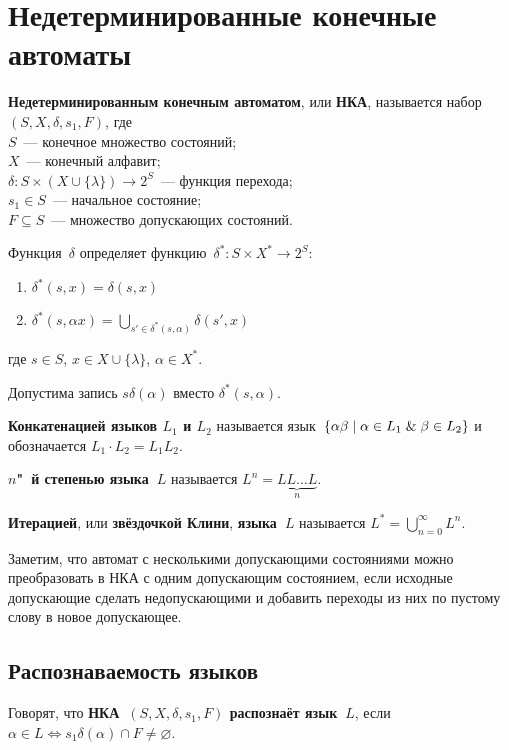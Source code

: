 \section{Недетерминированные конечные автоматы}
  \textbf{Недетерминированным конечным автоматом}, или \textbf{НКА}, называется набор~$(S, X, \delta, s_1, F)$, где\\
$S$~--- конечное множество состояний;\\
$X$~--- конечный алфавит;\\
$\delta \colon S \times (X \cup \{ \lambda \}) \to 2^S$~--- функция перехода;\\
$s_1 \in S$~--- начальное состояние;\\
$F \subseteq S$~--- множество допускающих состояний.

Функция~$\delta$ определяет функцию~$\delta^* \colon S \times X^* \to 2^S$:
\begin{enumerate}
	\item $\delta^*(s, x) = \delta(s, x)$
	\item $\delta^*(s, \alpha x) = \bigcup\limits_{s' \in \delta^*(s, \alpha)} \delta(s', x)$
\end{enumerate}
где $s \in S$, $x \in X \cup \{ \lambda \}$, $\alpha \in X^*$.

Допустима запись $s \delta(\alpha)$ вместо $\delta^*(s, \alpha)$.

 \textbf{Конкатенацией языков $L_1$ и $L_2$} называется язык~$\{ \alpha \beta \mid \alpha \in L_1 \mathrel{\&} \beta \in L_2 \}$ и обозначается $L_1 \cdot L_2 = L_1 L_2$.

 \textbf{$n$"~й степенью языка~$L$} называется $L^n = \underbrace{L L \ldots L}_n$.

  \textbf{Итерацией}, или \textbf{звёздочкой Клини}, \textbf{языка~$L$} называется $L^* = \bigcup\limits_{n=0}^\infty L^n$.

Заметим, что автомат с несколькими допускающими состояниями можно преобразовать в НКА с одним допускающим состоянием, если исходные допускающие сделать недопускающими и добавить переходы из них по пустому слову в новое допускающее.

\subsection{Распознаваемость языков}
Говорят, что \textbf{НКА~$(S, X, \delta, s_1, F)$ распознаёт язык~$L$}, если $\alpha \in L \Leftrightarrow s_1 \delta(\alpha) \cap F \neq \varnothing$.

